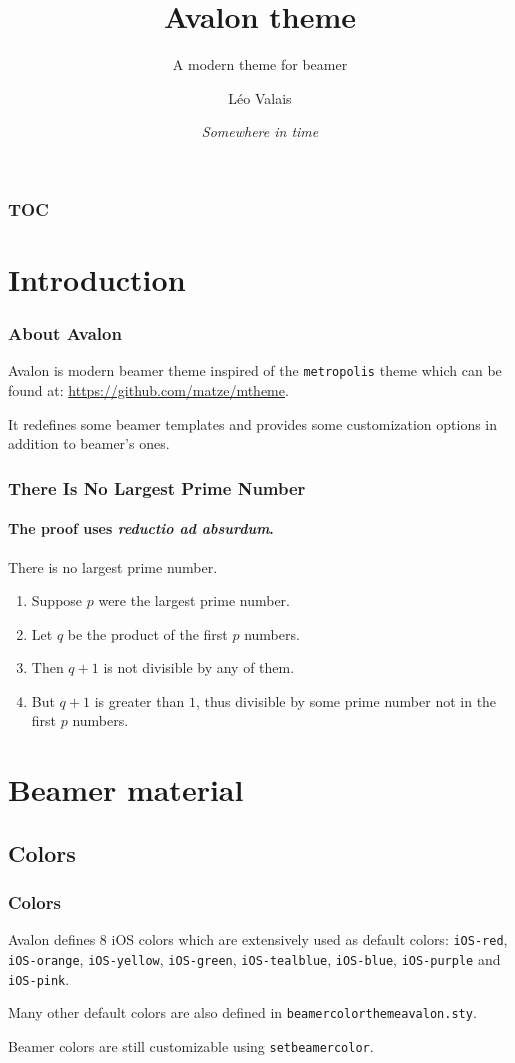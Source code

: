 \documentclass[aspectratio=169]{beamer}
\title{Avalon theme}
\subtitle{A modern theme for beamer}
\date{\it{}Somewhere in time \footnotesize\faMusic}
\author{Léo Valais}
\institute{Institute}
\begin{document}
\begin{frame}
\titlepage{}
\end{frame}

\begin{frame}
  \frametitle{TOC}
  \tableofcontents
\end{frame}

\section{Introduction}

\begin{frame}
  \frametitle{About Avalon}
  Avalon is modern beamer theme inspired of the \texttt{metropolis} theme which
  can be found at: \textcolor{iOS-tealblue}{\href{https://github.com/matze/mtheme}{https://github.com/matze/mtheme}}.

  It redefines some beamer templates and provides some customization options in
  addition to beamer's ones.
\end{frame}

\begin{frame}
  \frametitle{There Is No Largest Prime Number}
  \framesubtitle{The proof uses \textit{reductio ad absurdum}.}
  \begin{theorem}
    There is no largest prime number.
  \end{theorem}

  \begin{enumerate}
  \item Suppose $p$ were the largest prime number.
  \item Let $q$ be the product of the first $p$ numbers.
  \item Then $q+1$ is not divisible by any of them.
  \item But $q + 1$ is greater than $1$, \alert{thus divisible by some prime
      number} not in the first $p$ numbers.
  \end{enumerate}
\end{frame}

\section{Beamer material}
\subsection{Colors}
\begin{frame}[fragile]
  \frametitle{Colors}

  \newcommand{\col}[1]{\texttt{\textcolor{#1}{#1}}}
  Avalon defines 8 iOS colors which are extensively used as default colors:
  \col{iOS-red}, \col{iOS-orange}, \col{iOS-yellow}, \col{iOS-green},
  \col{iOS-tealblue}, \col{iOS-blue}, \col{iOS-purple} and \col{iOS-pink}.

  Many other default colors are also defined in
  \texttt{beamercolorthemeavalon.sty}.

  Beamer colors are still customizable using \texttt{setbeamercolor}.
\end{frame}
\end{document}
